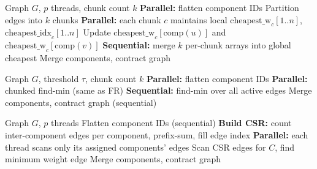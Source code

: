\documentclass[12pt, a4paper]{article}
\begin{document}
\begin{algorithm}[H]
\caption{Bor\r{u}vka Parallel Fold-Reduce (FR) --- Chunked Find-Min [4,6]}
\begin{algorithmic}[1]
\Require Graph $G$, $p$ threads, chunk count $k$
    \State \textbf{Parallel:} flatten component IDs 
    \State Partition edges into $k$ chunks
    \State \textbf{Parallel:} each chunk $c$ maintains local $\text{cheapest\_w}_c[1..n]$, $\text{cheapest\_idx}_c[1..n]$
     
            \State Update $\text{cheapest\_w}_c[\text{comp}(u)]$ and $\text{cheapest\_w}_c[\text{comp}(v)]$
        \EndFor
    \EndFor
    \State \textbf{Sequential:} merge $k$ per-chunk arrays into global cheapest 
    \State Merge components, contract graph
\EndWhile
\end{algorithmic}
\end{algorithm}

\begin{algorithm}[H]
\caption{Bor\r{u}vka Pooled --- Adaptive Chunked Parallel [4]}
\begin{algorithmic}[1]
\Require Graph $G$, threshold $\tau$, chunk count $k$
    \State \textbf{Parallel:} flatten component IDs
        \State \textbf{Parallel:} chunked find-min (same as FR) 
    \Else
        \State \textbf{Sequential:} find-min over all active edges 
    \EndIf
    \State Merge components, contract graph (sequential)
\EndWhile
\end{algorithmic}
\end{algorithm}

\begin{algorithm}[H]
\caption{Bor\r{u}vka Groups --- Per-Component CSR Parallel [6]}
\begin{algorithmic}[1]
\Require Graph $G$, $p$ threads
    \State Flatten component IDs (sequential)
    \State \textbf{Build CSR:} count inter-component edges per component, prefix-sum, fill edge index
    \State \textbf{Parallel:} each thread scans only its assigned components' edges 
        \State Scan CSR edges for $C$, find minimum weight edge
    \EndFor
    \State Merge components, contract graph
\EndWhile
\end{algorithmic}
\end{algorithm}
\end{document}
